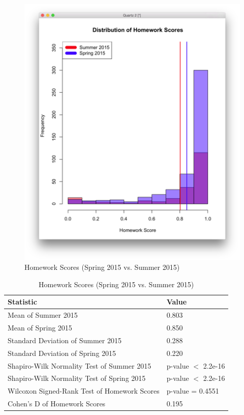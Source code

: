 \begin{figure}
	\centering
	\includegraphics[width=6in]{img/chapter4/hw_su15_vs_sp15}
	\caption[Homework Scores (Spring 2015 vs. Summer 2015)]{Homework Scores (Spring 2015 vs. Summer 2015)}
  \label{fig:hwSu14Su15}
\end{figure}

\begin{small}
\begin{table}
  \centering
  \begin{tabular}{|l|l|}
    \hline
    \textbf{Statistic} & \textbf{Value} \\
	\hline
	Mean of Summer 2015 & 0.803 \\
	\hline
	Mean of Spring 2015 & 0.850 \\
	\hline
	Standard Deviation of Summer 2015 & 0.288 \\
	\hline
	Standard Deviation of Spring 2015 & 0.220 \\
	\hline
	Shapiro-Wilk Normality Test of Summer 2015 & p-value $<$ 2.2e-16 \\
	\hline
	Shapiro-Wilk Normality Test of Spring 2015 & p-value $<$ 2.2e-16 \\
	\hline
	Wilcoxon Signed-Rank Test of Homework Scores & p-value = 0.4551 \\
	\hline
	Cohen's D of Homework Scores & 0.195 \\
	\hline
  \end{tabular}
	\caption[Homework Scores (Spring 2015 vs. Summer 2015)]{Homework Scores (Spring 2015 vs. Summer 2015)}
  \label{fig:hwSu14Su15}
\end{table}
\end{small}


